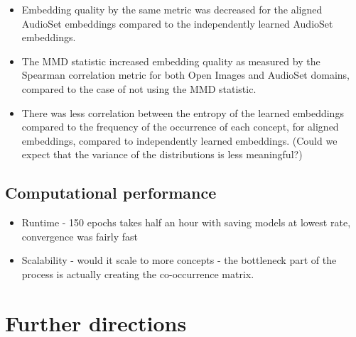 \begin{itemize}
    \item Embedding quality by the same metric was decreased for the aligned AudioSet embeddings compared to the independently learned AudioSet embeddings. 
    \item The MMD statistic increased embedding quality as measured by the Spearman correlation metric for both Open Images and AudioSet domains, compared to the case of not using the MMD statistic. 
    \item There was less correlation between the entropy of the learned embeddings compared to the frequency of the occurrence of each concept, for aligned embeddings, compared to independently learned embeddings. (Could we expect that the variance of the distributions is less meaningful?)
\end{itemize}

\subsection{Computational performance}
\begin{itemize}
    \item Runtime - 150 epochs takes half an hour with saving models at lowest rate, convergence was fairly fast
    \item Scalability - would it scale to more concepts - the bottleneck part of the process is actually creating the co-occurrence matrix. 
\end{itemize}

\section{Further directions}

